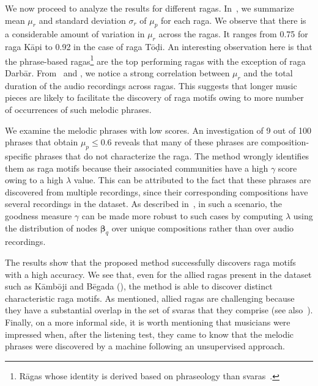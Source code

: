 {We now proceed to analyze the results for different \glspl{raga}. In~, we summarize mean $\mu_r$ and standard deviation $\sigma_r$ of $\mu_p$ for each \gls{raga}. We observe that there is a considerable amount of variation in $\mu_r$ across the \glspl{raga}. It ranges from 0.75 for \gls{raga} K\={a}pi to 0.92 in the case of \gls{raga} T\={o}\d{d}i. An interesting observation here is that the phrase-based \glspl{raga}\footnote{R\={a}gas whose identity is derived based on phraseology than svaras~\cite{krishna2012carnatic}.} are the top performing \glspl{raga} with the  exception of \gls{raga} Darb\={a}r. From~ and , we notice a strong correlation between $\mu_r$ and the total duration of the audio recordings across \glspl{raga}. This suggests that longer music pieces are likely to facilitate the discovery of \gls{raga} motifs owing to more number of occurrences of such melodic phrases.

We examine the melodic phrases with low scores. An investigation of 9 out of 100 phrases that obtain $\mu_p\leq0.6$ reveals that many of these phrases are composition-specific phrases that do not characterize the \gls{raga}. The method wrongly identifies them as \gls{raga} motifs because their associated communities have a high $\gamma$ score owing to a high $\lambda$ value. This can be attributed to the fact that these phrases are discovered from multiple recordings, since their corresponding compositions have several recordings in the dataset.  As described in~, in such a scenario, the goodness measure $\gamma$ can be made more robust to such cases by computing $\lambda$ using the distribution of nodes ${\boldsymbol{\beta}_q}$ over unique compositions rather than over audio recordings.

The results show that the proposed method successfully discovers \gls{raga} motifs with a high accuracy. We see that, even for the allied \glspl{raga} present in the dataset such as K\={a}mb\={o}ji and B\={e}gada (), the method is able to discover distinct characteristic \gls{raga} motifs. As mentioned, allied \glspl{raga} are challenging because they have a substantial overlap in the set of svaras that they comprise (see also~). Finally, on a more informal side, it is worth mentioning that musicians were impressed when, after the listening test, they came to know that the melodic phrases were discovered by a machine following an unsupervised approach. 


}
